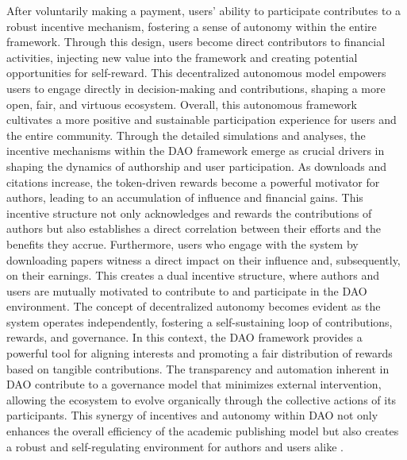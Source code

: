 \documentclass[lettersize,journal]{IEEEtran}
\begin{document}



After voluntarily making a payment, users' ability to participate contributes to a robust incentive mechanism, fostering a sense of autonomy within the entire framework. Through this design, users become direct contributors to financial activities, injecting new value into the framework and creating potential opportunities for self-reward. This decentralized autonomous model empowers users to engage directly in decision-making and contributions, shaping a more open, fair, and virtuous ecosystem. Overall, this autonomous framework cultivates a more positive and sustainable participation experience for users and the entire community.
Through the detailed simulations and analyses, the incentive mechanisms within the DAO framework emerge as crucial drivers in shaping the dynamics of authorship and user participation. As downloads and citations increase, the token-driven rewards become a powerful motivator for authors, leading to an accumulation of influence and financial gains. This incentive structure not only acknowledges and rewards the contributions of authors but also establishes a direct correlation between their efforts and the benefits they accrue.
Furthermore, users who engage with the system by downloading papers witness a direct impact on their influence and, subsequently, on their earnings. This creates a dual incentive structure, where authors and users are mutually motivated to contribute to and participate in the DAO environment. The concept of decentralized autonomy becomes evident as the system operates independently, fostering a self-sustaining loop of contributions, rewards, and governance.
In this context, the DAO framework provides a powerful tool for aligning interests and promoting a fair distribution of rewards based on tangible contributions. The transparency and automation inherent in DAO contribute to a governance model that minimizes external intervention, allowing the ecosystem to evolve organically through the collective actions of its participants. This synergy of incentives and autonomy within DAO not only enhances the overall efficiency of the academic publishing model but also creates a robust and self-regulating environment for authors and users alike \cite{ostrom1990governing}.
\end{document}
